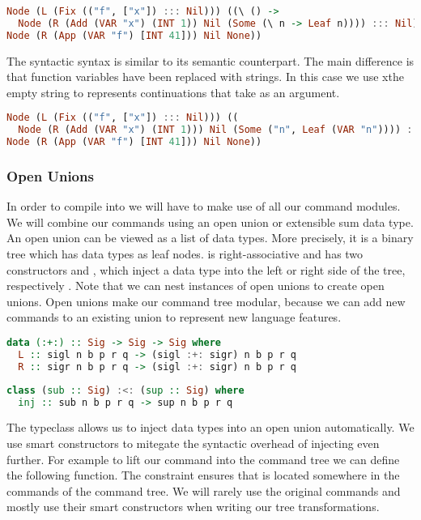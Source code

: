 \begin{lstlisting}[language=Haskell]
Node (L (Fix (("f", ["x"]) ::: Nil))) ((\ () ->
  Node (R (Add (VAR "x") (INT 1)) Nil (Some (\ n -> Leaf n)))) ::: Nil) (Some (\ () ->
Node (R (App (VAR "f") [INT 41])) Nil None))
\end{lstlisting}

The syntactic syntax is similar to its semantic counterpart. The main difference is that function variables have been replaced with strings. In this case we use xthe empty string  to represents continuations that take \icode{()} as an argument.

\begin{lstlisting}[language=Haskell]
Node (L (Fix (("f", ["x"]) ::: Nil))) ((
  Node (R (Add (VAR "x") (INT 1))) Nil (Some ("n", Leaf (VAR "n")))) ::: Nil) (Some ("",
Node (R (App (VAR "f") [INT 41])) Nil None))
\end{lstlisting}

\subsubsection{\label{subsection:openunion}Open Unions}
In order to compile  into  we will have to make use of all our command modules. We will combine our commands using an open union or extensible sum data type. An open union can be viewed as a list of data types. More precisely, it is a binary tree which has data types as leaf nodes. \icode{:+:} is right-associative and has two constructors  and , which inject a data type into the left or right side of the tree, respectively \autocite{DBLP:conf/popl/LiangHJ95}. Note that we can nest instances of open unions to create open unions. Open unions make our command tree modular, because we can add new commands to an existing union to represent new language features.

\begin{lstlisting}[language=Haskell]
data (:+:) :: Sig -> Sig -> Sig where
  L :: sigl n b p r q -> (sigl :+: sigr) n b p r q
  R :: sigr n b p r q -> (sigl :+: sigr) n b p r q
\end{lstlisting}

\begin{lstlisting}[language=Haskell]
class (sub :: Sig) :<: (sup :: Sig) where
  inj :: sub n b p r q -> sup n b p r q
\end{lstlisting}

The typeclass \icode{:<:} allows us to inject data types into an open union automatically. We use smart constructors to mitegate the syntactic overhead of injecting \autocite{DBLP:conf/popl/LiangHJ95} even further. For example to lift our  command into the command tree we can define the following function. The constraint  ensures that  is located somewhere in the commands of the command tree. We will rarely use the original commands and mostly use their smart constructors when writing our tree transformations.

